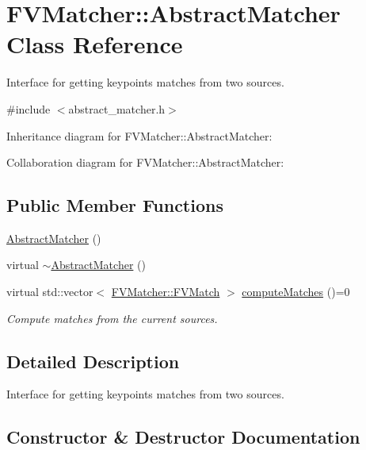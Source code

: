\hypertarget{classFVMatcher_1_1AbstractMatcher}{}\section{F\+V\+Matcher\+:\+:Abstract\+Matcher Class Reference}
\label{classFVMatcher_1_1AbstractMatcher}


Interface for getting keypoints matches from two sources.  




{\ttfamily \#include $<$abstract\+\_\+matcher.\+h$>$}



Inheritance diagram for F\+V\+Matcher\+:\+:Abstract\+Matcher\+:


Collaboration diagram for F\+V\+Matcher\+:\+:Abstract\+Matcher\+:
\subsection*{Public Member Functions}
\begin{DoxyCompactItemize}
\item 
\hyperlink{classFVMatcher_1_1AbstractMatcher_a3d2fd73c64b319bbc2192aa22ff095cd}{Abstract\+Matcher} ()
\item 
virtual \hyperlink{classFVMatcher_1_1AbstractMatcher_a9d60199b22f6eaac0ae36324f7a07952}{$\sim$\+Abstract\+Matcher} ()
\item 
virtual std\+::vector$<$ \hyperlink{structFVMatcher_1_1FVMatch}{F\+V\+Matcher\+::\+F\+V\+Match} $>$ \hyperlink{classFVMatcher_1_1AbstractMatcher_a201dc53542e0d9a10a08f8418b55d20a}{compute\+Matches} ()=0
\begin{DoxyCompactList}\small\item\em Compute matches from the current sources. \end{DoxyCompactList}\end{DoxyCompactItemize}


\subsection{Detailed Description}
Interface for getting keypoints matches from two sources. 

\subsection{Constructor \& Destructor Documentation}
\hypertarget{classFVMatcher_1_1AbstractMatcher_a3d2fd73c64b319bbc2192aa22ff095cd}{}
